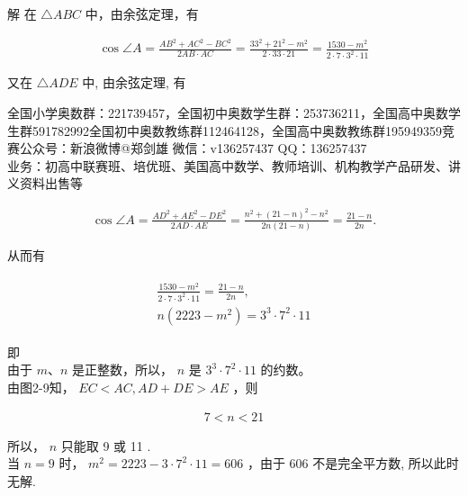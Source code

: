 \documentclass[10pt]{article}
\begin{document}
解 在 $\triangle A B C$ 中，由余弦定理，有

\begin{align*}
\cos \angle A=\frac{A B^{2}+A C^{2}-B C^{2}}{2 A B \cdot A C}=\frac{33^{2}+21^{2}-m^{2}}{2 \cdot 33 \cdot 21}=\frac{1530-m^{2}}{2 \cdot 7 \cdot 3^{2} \cdot 11}
\end{align*}

又在 $\triangle A D E$ 中, 由余弦定理, 有

全国小学奥数群：221739457，全国初中奥数学生群：253736211，全国高中奥数学生群591782992全国初中奥数教练群112464128，全国高中奥数教练群195949359竞赛公众号：新浪微博@郑剑雄 微信：v136257437 QQ：136257437\\
业务：初高中联赛班、培优班、美国高中数学、教师培训、机构教学产品研发、讲义资料出售等

\begin{align*}
\cos \angle A=\frac{A D^{2}+A E^{2}-D E^{2}}{2 A D \cdot A E}=\frac{n^{2}+(21-n)^{2}-n^{2}}{2 n(21-n)}=\frac{21-n}{2 n} .
\end{align*}

从而有

\begin{align*}
\begin{gathered}
\frac{1530-m^{2}}{2 \cdot 7 \cdot 3^{2} \cdot 11}=\frac{21-n}{2 n}, \\
n\left(2223-m^{2}\right)=3^{3} \cdot 7^{2} \cdot 11
\end{gathered}
\end{align*}

即\\
由于 $m 、 n$ 是正整数，所以， $n$ 是 $3^{3} \cdot 7^{2} \cdot 11$ 的约数。\\
由图2-9知， $E C<A C, A D+D E>A E$ ，则

\begin{align*}
7<n<21
\end{align*}

所以， $n$ 只能取 9 或 11 .\\
当 $n=9$ 时， $m^{2}=2223-3 \cdot 7^{2} \cdot 11=606$ ，由于 606 不是完全平方数, 所以此时无解.
\end{document}
